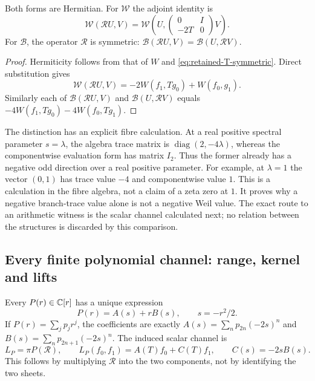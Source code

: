 \begin{proposition}
Both forms are Hermitian. For $\mathcal W$ the adjoint identity is
\[
 \mathcal W(\mathcal R U,V)
 =\mathcal W\left(U,
       \begin{pmatrix}0&I\\-2T&0\end{pmatrix}V\right).
\]
For $\mathcal B$, the operator $\mathcal R$ is symmetric:
$\mathcal B(\mathcal R U,V)=\mathcal B(U,\mathcal R V)$.
\end{proposition}
\begin{proof}
Hermiticity follows from that of $W$ and
\eqref{eq:retained-T-symmetric}. Direct substitution gives
\[
 \mathcal W(\mathcal R U,V)
 =-2W(f_1,Tg_0)+W(f_0,g_1).
\]
Similarly each of $\mathcal B(\mathcal R U,V)$ and
$\mathcal B(U,\mathcal R V)$ equals
$-4W(f_1,Tg_0)-4W(f_0,Tg_1)$.
\end{proof}

The distinction has an explicit fibre calculation. At a real positive
spectral parameter $s=\lambda$, the algebra trace matrix is
$\operatorname{diag}(2,-4\lambda)$, whereas the componentwise evaluation
form has matrix $I_2$. Thus the former already has a negative odd
direction over a real positive parameter. For example, at $\lambda=1$
the vector $(0,1)$ has trace value $-4$ and componentwise value $1$.
This is a calculation in the fibre algebra, not a claim of a zeta zero
at $1$. It proves why a negative branch-trace value alone is not a
negative Weil value. The exact route to an arithmetic witness is the
scalar channel calculated next; no relation between the structures is
discarded by this comparison.

\subsection{Every finite polynomial channel: range, kernel and lifts}
Every $P(r)\in\mathbb C[r]$ has a unique expression
\[
 P(r)=A(s)+rB(s),\qquad s=-r^2/2.
\]
If $P(r)=\sum_j p_jr^j$, the coefficients are exactly
$A(s)=\sum_n p_{2n}(-2s)^n$ and
$B(s)=\sum_n p_{2n+1}(-2s)^n$.
The induced scalar channel is
\begin{equation}
 L_P=\pi P(\mathcal R),\qquad
 L_P(f_0,f_1)=A(T)f_0+C(T)f_1,\qquad C(s)=-2sB(s).
 \label{eq:retained-polynomial-channel}
\end{equation}
This follows by multiplying $\mathcal R$ into the two components,
not by identifying the two sheets.

